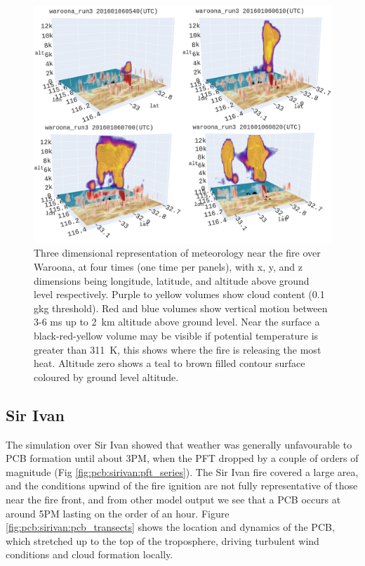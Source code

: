     \begin{figure}
      \centering
      \includegraphics[width=1\linewidth]{../../figures/project/threedee/waroona_run3_pcb.png}
      \caption{%
        Three dimensional representation of meteorology near the fire over Waroona, at four times (one time per panels), with x, y, and z dimensions being longitude, latitude, and altitude above ground level respectively.
        Purple to yellow volumes show cloud content (0.1 g\/kg threshold).
        Red and blue volumes show vertical motion between 3-6 m\/s up to 2~km altitude above ground level.
        Near the surface a black-red-yellow volume may be visible if potential temperature is greater than 311~K, this shows where the fire is releasing the most heat.
        Altitude zero shows a teal to brown filled contour surface coloured by ground level altitude.
        }
      \label{fig:pcb:waroona:pcb_3d}
    \end{figure}

  
  \subsection{Sir Ivan}
    \label{pcb:sirivan}
    
    The simulation over Sir Ivan showed that weather was generally unfavourable to PCB formation until about 3PM, when the PFT dropped by a couple of orders of magnitude (Fig \ref{fig:pcb:sirivan:pft_series}).
    The Sir Ivan fire covered a large area, and the conditions upwind of the fire ignition are not fully representative of those near the fire front, and from other model output we see that a PCB occurs at around 5PM lasting on the order of an hour.
    Figure \ref{fig:pcb:sirivan:pcb_transects} shows the location and dynamics of the PCB, which stretched up to the top of the troposphere, driving turbulent wind conditions and cloud formation locally.
    
